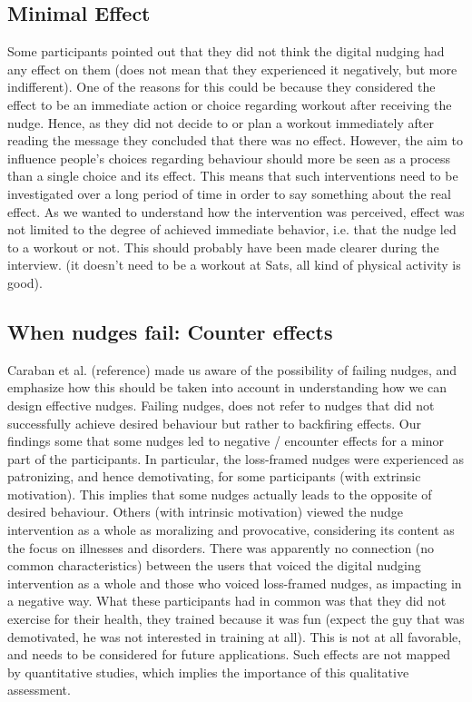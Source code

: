 \subsection{Minimal Effect}
Some participants pointed out that they did not think the digital nudging had any effect on them (does not mean that they experienced it negatively, but more indifferent). One of the reasons for this could be because they considered the effect to be an immediate action or choice regarding workout after receiving the nudge. Hence, as they did not decide to or plan a workout immediately after reading the message they concluded that there was no effect. However, the aim to influence people's choices regarding behaviour should more be seen as a process than a single choice and its effect. This means that such interventions need to be investigated over a long period of time in order to say something about the real effect. As we wanted to understand how the intervention was perceived, effect was not limited to the degree of achieved immediate behavior, i.e. that the nudge led to a workout or not. This should probably have been made clearer during the interview. (it doesn't need to be a workout at Sats, all kind of physical activity is good).

\subsection{When nudges fail: Counter effects}
Caraban et al. (reference) made us aware of the possibility of failing nudges, and emphasize how this should be taken into account in understanding how we can design effective nudges. Failing nudges, does not refer to nudges that did not successfully achieve desired behaviour but rather to backfiring effects. Our findings some that some nudges led to negative / encounter effects for a minor part of the participants. In particular, the loss-framed nudges were experienced as patronizing, and hence demotivating, for some participants (with extrinsic motivation). This implies that some nudges actually leads to the opposite of desired behaviour. Others (with intrinsic motivation) viewed the nudge intervention as a whole as moralizing and provocative, considering its content as the focus on illnesses and disorders. There was apparently no connection (no common characteristics) between the users that voiced the digital nudging intervention as a whole and those who voiced loss-framed nudges, as impacting in a negative way. What these participants had in common was that they did not exercise for their health, they trained because it was fun (expect the guy that was demotivated, he was not interested in training at all). This is not at all favorable, and needs to be considered for future applications. Such effects are not mapped by quantitative studies, which implies the importance of this qualitative assessment.  


